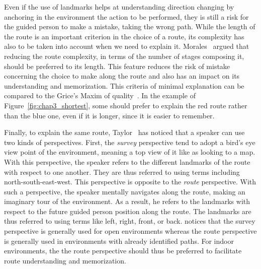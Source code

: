 Even if the use of landmarks helps at understanding direction changing by anchoring in the environment the action to be performed, they is still a risk for the guided person to make a mistake, taking the wrong path. While the length of the route is an important criterion in the choice of a route, its complexity has also to be taken into account when we need to explain it. Morales~\cite{morales_2015_building} argued that reducing the route complexity, in terms of the number of stages composing it, should be preferred to its length. This feature reduces the risk of mistake concerning the choice to make along the route and also has an impact on its understanding and memorization. This criteria of minimal explanation can be compared to the Grice's Maxim of quality~\cite{grice_1975_logic}. In the example of Figure~\ref{fig:chap3_shortest}, some should prefer to explain the red route rather than the blue one, even if it is longer, since it is easier to remember.

Finally, to explain the same route, Taylor~\cite{taylor_1992_spatial} has noticed that a speaker can use two kinds of perspectives. First, the \textit{survey} perspective tend to adopt a bird's eye view point of the environment, meaning a top view of it like as looking to a map. With this perspective, the speaker refers to the different landmarks of the route with respect to one another. They are thus referred to using terms including north-south-east-west. This perspective is opposite to the \textit{route} perspective. With such a perspective, the speaker mentally navigates along the route, making an imaginary tour of the environment. As a result, he refers to the landmarks with respect to the future guided person position along the route. The landmarks are thus referred to using terms like left, right, front, or back. \cite{taylor_1996_perspective} notices that the survey perspective is generally used for open environments whereas the route perspective is generally used in environments with already identified paths. For indoor environments, the the route perspective should thus be preferred to facilitate route understanding and memorization.



